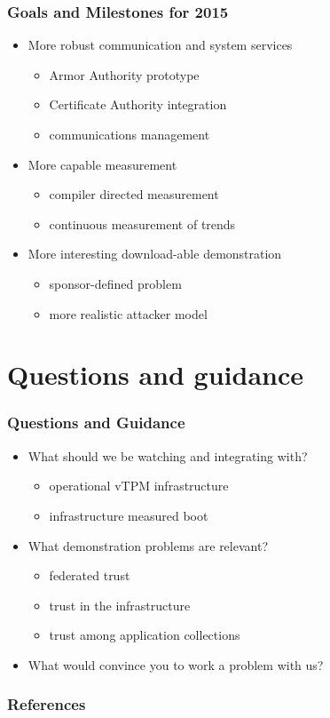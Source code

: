 \documentclass{beamer}
\begin{document}
\begin{frame}
  \frametitle{Goals and Milestones for 2015}

  \begin{itemize}
  \item More robust communication and system services
    \begin{itemize}
    \item Armor Authority prototype
    \item Certificate Authority integration
    \item communications management
    \end{itemize}
  \item More capable measurement
    \begin{itemize}
    \item compiler directed measurement
    \item continuous measurement of trends
    \end{itemize}
  \item More interesting download-able demonstration
    \begin{itemize}
    \item sponsor-defined problem
    \item more realistic attacker model
    \end{itemize}
  \end{itemize}
\end{frame}

\section{Questions and guidance}

\begin{frame}
  \frametitle{Questions and Guidance}

  \begin{itemize}
  \item What should we be watching and integrating with?
    \begin{itemize}
    \item operational vTPM infrastructure
    \item infrastructure measured boot
    \end{itemize}
  \item What demonstration problems are relevant?
    \begin{itemize}
    \item federated trust
    \item trust in the infrastructure
    \item trust among application collections
    \end{itemize}
  \item What would convince you to work a problem with us?
  \end{itemize}
\end{frame}

\nocite{Coker::Principles-of-R,Haldar:04:Semantic-Remote,Fabrega:1999aa,Ryan:09:Introduction-to}

\begin{frame}
  \frametitle{References}
  
\end{frame}
\end{document}
